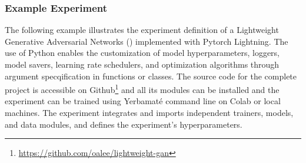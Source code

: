 \documentclass{article}
\begin{document}
\subsubsection{Example Experiment}

The following example illustrates the experiment definition of a Lightweight Generative Adversarial Networks (\cite{lgan,goodfellow2020generative}) implemented with Pytorch Lightning. The use of Python enables the customization of model hyperparameters, loggers, model savers, learning rate schedulers, and optimization algorithms through argument specqification in functions or classes. The source code for the complete project is accessible on Github\footnote{\url{https://github.com/oalee/lightweight-gan}} and all its modules can be installed and the experiment can be trained using Yerbamaté command line on Colab or local machines. The experiment integrates and imports independent trainers, models, and data modules, and defines the experiment's hyperparameters.
\end{document}
